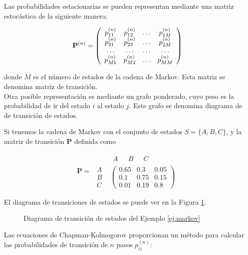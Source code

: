 Las probabilidades estacionarias se pueden representan mediante una matriz estocástica de la siguiente manera:

\[ \mathbf{P}^{(n)} = \left(\begin{array}{c c c c}
p_{11}^{(n)} & p_{12}^{(n)} & \dots & p_{1M}^{(n)}\\
p_{21}^{(n)} & p_{22}^{(n)} & \dots & p_{2M}^{(n)}\\
\dots        & \dots        & \dots & \dots\\
p_{M1}^{(n)} & p_{M2}^{(n)} & \dots & p_{MM}^{(n)}  
\end{array}\right) \]

donde $M$ es el número de estados de la cadena de Markov. Esta matriz se denomina matriz de transición.\\

Otra posible representación es mediante un grafo ponderado, cuyo peso es la probabilidad de ir del estado $i$ al estado $j$. Este grafo se denomina diagrama de  de transición de estados.

\begin{ejemplo} \label{ej:markov}
Si tenemos la cadena de Markov con el conjunto de estados $S = \{A,B,C\}$, y la matriz de transición $\mathbf{P}$ definida como

\[ \mathbf{P} = \begin{array}{cc}
& \begin{array}{ccc}
A \ \ \ & B & \ \ \ C
\end{array} \\
\begin{array}{c}
A\\
B\\
C
\end{array} & \left(\begin{array}{ccc}
0.65 & 0.3  & 0.05\\
0.1  & 0.75 & 0.15\\
0.01 & 0.19 & 0.8
\end{array}\right)
\end{array} \] 

El diagrama de transiciones de estados se puede ver en la Figura \ref{fig:markov}.

\begin{figure}[htb]
\centering
\ejemplomarkov
\caption{Diagrama de transición de estados del Ejemplo \ref{ej:markov}}
\label{fig:markov}
\end{figure}
\end{ejemplo}

Las ecuaciones de Chapman-Kolmogorov proporcionan un método para calcular las probabilidades de transición de $n$ pasos $p_{ij}^{(n)}$:

